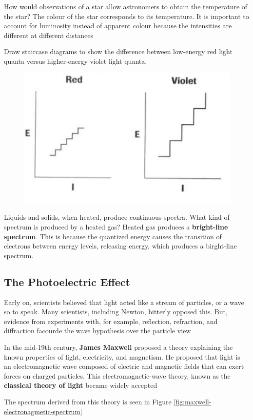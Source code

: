 \begin{sample}{How would observations of a star allow astronomers to obtain the temperature of
    the star?}
    The colour of the star corresponds to its temperature. It is important to account for luminosity
    instead of apparent colour because the intensities are different at different distances
\end{sample}

\begin{sample}{Draw staircase diagrams to show the difference between low-energy red light quanta
    versus higher-energy violet light quanta.}
    \begin{figure}[ht!]
        \centering
        \includegraphics[width=0.3 \textwidth]{../figures/red-light-quanta-versus-violet-light-quanta.png}
    \end{figure}
\end{sample}

\begin{sample}{Liquids and solids, when heated, produce continuous spectra. What kind of spectrum
    is produced by a heated gas?}
    Heated gas produces a \textbf{bright-line spectrum}. This is because the quantized energy causes the transition
    of electrons between energy levels, releasing energy, which produces a birght-line spectrum.
\end{sample}

\subsection{The Photoelectric Effect}
\begin{bulleted-list}
    \item Early on, scientists believed that light acted like a stream of particles, or a wave
        so to speak. Many scientists, including Newton, bitterly opposed this. But, evidence from
        experiments with, for example, reflection, refraction, and diffraction facourde the
        wave hypothesis over the particle view
    \item In the mid-19th century, \textbf{James Maxwell} proposed a theory explaining the known
        properties of light, electricity, and magnetism. He proposed that light is an electromagnetic
        wave composed of electric and magnetic fields that can exert forces on charged particles. This
        electromagnetic-wave theory, known as the \textbf{classical theory of light} became widely
        accepted
    \item The spectrum derived from this theory is seen in Figure \ref{fig:maxwell-electronagmetic-spectrum}
\end{bulleted-list}

